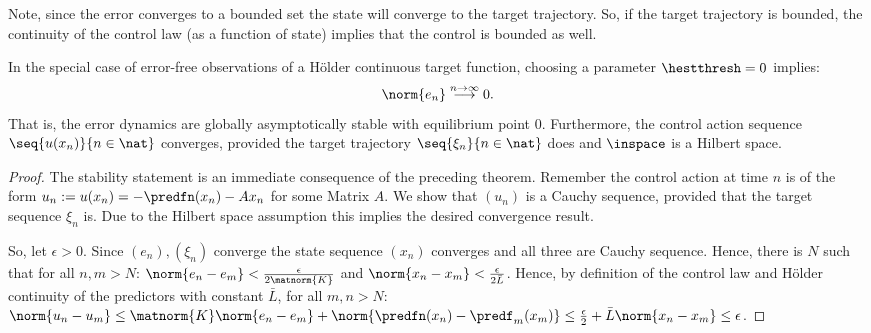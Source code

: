 Note, since the error converges to a bounded set the state will converge to the target trajectory. So, if the target trajectory is bounded, the continuity of the control law (as a function of state) implies that the control is bounded as well.

%
%
\begin{cor}
In the special case of error-free observations of a H\"older continuous target function, choosing a parameter $\hestthresh =0$ implies:
\[\norm{e_n} \stackrel{n \to \infty}{\longrightarrow} 0. \]
That is, the error dynamics are globally asymptotically stable with equilibrium point 0.
Furthermore, the control action sequence $\seq{u(x_n)}{n \in \nat}$ converges, provided the target trajectory $\seq{\xi_n}{n \in \nat}$ does and $\inspace$ is a Hilbert space.
\end{cor}

\begin{proof} The stability statement is an immediate consequence of the preceding theorem. 
Remember the control action at time $n$ is of the form $u_n := u(x_n) = -\predfn(x_n) - A x_n $ for some Matrix $A$. We show that $(u_n)$ is a Cauchy sequence, provided that the target sequence $\xi_n$ is. Due to the Hilbert space assumption this implies the desired convergence result.

So, let $\epsilon >0$. Since $(e_n),(\xi_n)$ converge the state sequence $(x_n)$ converges and all three are Cauchy sequence. Hence, there is $N$ such that for all $n,m >N$: $\norm{e_n-e_m}< \frac{\epsilon} {2 \matnorm{K}}$ and $\norm{x_n-x_m}< \frac{\epsilon} {2\bar L}$. 
Hence, by definition of the control law and H\"older continuity of the predictors with constant $\bar L$, for all $m,n >N:$ $\norm{u_n-u_m} \leq \matnorm{K} \norm{e_n -e_m} + \norm{\predfn(x_n) - \predf_m(x_m) } \leq \frac{\epsilon}{2} + \bar L \norm{x_n -x_m} \leq \epsilon $.

\end{proof}


